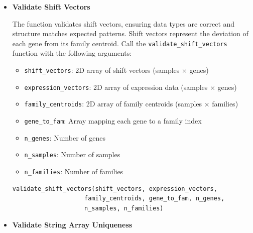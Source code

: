 \begin{enumerate}
\begin{itemize}
            \item \textbf{Validate Shift Vectors}
                  
                  The function validates shift vectors, ensuring data types are correct
                  and structure matches expected patterns. Shift vectors represent the deviation
                  of each gene from its family centroid. Call the \texttt{validate\_shift\_vectors}
                  function with the following arguments:
                  
                  \begin{itemize}
                    \item \texttt{shift\_vectors}: 2D array of shift vectors (samples ×
                          genes)
                          
                    \item \texttt{expression\_vectors}: 2D array of expression data (samples
                          × genes)
                          
                    \item \texttt{family\_centroids}: 2D array of family centroids (samples
                          × families)
                          
                    \item \texttt{gene\_to\_fam}: Array mapping each gene to a family index
                          
                    \item \texttt{n\_genes}: Number of genes
                          
                    \item \texttt{n\_samples}: Number of samples
                          
                    \item \texttt{n\_families}: Number of families
                  \end{itemize}
                  
                  \begin{lstlisting}[language=Python, caption={Python Validate Shift Vectors}]
validate_shift_vectors(shift_vectors, expression_vectors, 
                    family_centroids, gene_to_fam, n_genes, 
                    n_samples, n_families)
                  \end{lstlisting}
                  
            \item \textbf{Validate String Array Uniqueness}
                  

\end{itemize}
\end{enumerate}
